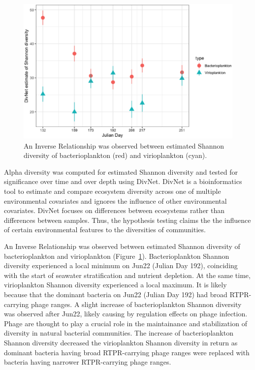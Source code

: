 \documentclass[a4,center,fleqn]{NAR}
\begin{document}
\begin{figure}[t]
\begin{center}
\includegraphics[width=15cm]{Bacterial_and_viral_shannon_day}
\end{center}
\caption{An Inverse Relationship was observed between estimated Shannon diversity of bacterioplankton (red) and virioplankton (cyan).
}
\label{alpha_div} 
\end{figure}

Alpha diversity was computed for estimated Shannon diversity and tested for significance over time and over depth using DivNet. 
DivNet is a bioinformatics tool to estimate and compare ecosystem diversity across one of multiple environmental covariates and ignores the influence of other environmental covariates.
DivNet focuses on differences between ecosystems rather than differences between samples.
Thus, the hypothesis testing claims the the influence of certain environmental features to the diversities of communities.

An Inverse Relationship was observed between estimated Shannon diversity of  bacterioplankton and virioplankton (Figure~\ref{alpha_div}).
Bacterioplankton Shannon diversity experienced a local minimum on Jun22 (Julian Day 192), coinciding with the start of seawater stratification and nutrient depletion.
At the same time, virioplankton Shannon diversity experienced a local maximum. It is likely because that the dominant bacteria on Jun22 (Julian Day 192) had broad RTPR-carrying phage ranges.
A slight increase of bacterioplankton Shannon diversity was observed after Jun22, likely causing by regulation effects on phage infection. 
Phage are thought to play a crucial role in the maintainance and stabilization of diversity in natural bacterial communities.
The increase of bacterioplankton Shannon diversity decreased the virioplankton Shannon diversity in return as dominant bacteria having broad RTPR-carrying phage ranges were replaced with bacteria having narrower RTPR-carrying phage ranges.
\end{document}

